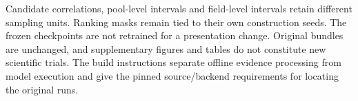 Candidate correlations, pool-level intervals and field-level intervals retain
different sampling units. Ranking masks remain tied to their own construction
seeds. The frozen checkpoints are not retrained for a presentation change.
Original bundles are unchanged, and supplementary figures and tables do not
constitute new scientific trials. The build instructions separate offline
evidence processing from model execution and give the pinned source/backend
requirements for locating the original runs.
